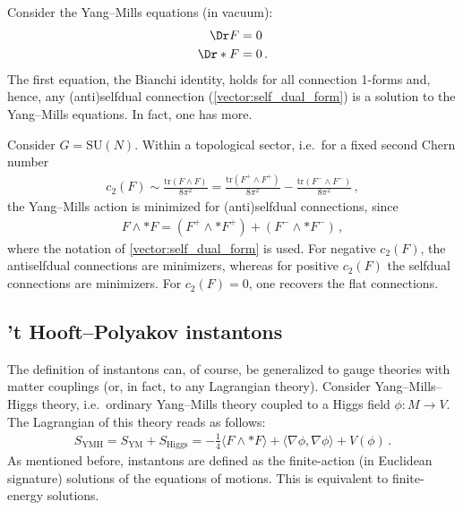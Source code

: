     Consider the Yang--Mills equations (in vacuum):
    \begin{align*}
        \Dr F &= 0\\
        \Dr\ast F &= 0\,.
    \end{align*}
    The first equation, the Bianchi identity, holds for all connection 1-forms and, hence, any (anti)selfdual connection (\cref{vector:self_dual_form}) is a solution to the Yang--Mills equations. In fact, one has more.
    \begin{property}[Minimizers]
        Consider $G=\mathrm{SU}(N)$. Within a topological sector, i.e.~for a fixed second Chern number
        \begin{gather}
            c_2(F) \sim \frac{\mathrm{tr}(F\wedge F)}{8\pi^2} = \frac{\mathrm{tr}(F^+\wedge F^+)}{8\pi^2} - \frac{\mathrm{tr}(F^-\wedge F^-)}{8\pi^2}\,,
        \end{gather}
        the Yang--Mills action is minimized for (anti)selfdual connections, since
        \begin{gather*}
            F\wedge\ast F = (F^+\wedge\ast F^+)+(F^-\wedge\ast F^-)\,,
        \end{gather*}
        where the notation of \cref{vector:self_dual_form} is used. For negative $c_2(F)$, the antiselfdual connections are minimizers, whereas for positive $c_2(F)$ the selfdual connections are minimizers. For $c_2(F)=0$, one recovers the flat connections.
    \end{property}

\subsection{'t Hooft--Polyakov instantons}

    The definition of instantons can, of course, be generalized to gauge theories with matter couplings (or, in fact, to any Lagrangian theory). Consider Yang--Mills--Higgs theory, i.e.~ordinary Yang--Mills theory coupled to a Higgs field $\phi:M\rightarrow V$. The Lagrangian of this theory reads as follows:
    \begin{gather}
        S_{\text{YMH}} = S_{\text{YM}} + S_{\text{Higgs}} = -\frac{1}{4}\langle F\wedge\ast F\rangle + \langle\nabla\phi,\nabla\phi\rangle + V(\phi)\,.
    \end{gather}
    As mentioned before, instantons are defined as the finite-action (in Euclidean signature) solutions of the equations of motions. This is equivalent to finite-energy solutions.

